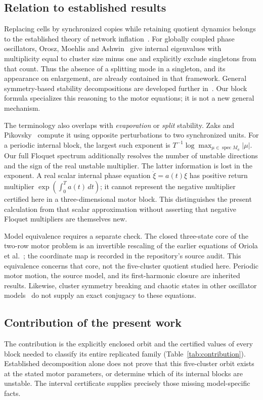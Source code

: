 \documentclass[11pt]{article}
\newcommand{\spec}{\operatorname{spec}}
\begin{document}
\subsection{Relation to established results}
Replacing cells by synchronized copies while retaining quotient dynamics
belongs to the established theory of network inflation~\cite{aguiar}.
For globally coupled phase oscillators, Orosz, Moehlis and
Ashwin~\cite[Sec.~2, Eqs.~(2.19)--(2.23)]{orosz} give internal eigenvalues
with multiplicity equal to cluster size minus one and explicitly exclude
singletons from that count. Thus the absence of a splitting mode in a
singleton, and its appearance on enlargement, are already contained in
that framework. General symmetry-based stability decompositions are
developed further in~\cite{pecora,sorrentino}. Our block formula specializes
this reasoning to the motor equations; it is not a new general mechanism.

The terminology also overlaps with \emph{evaporation} or \emph{split}
stability. Zaks and Pikovsky~\cite[Methods]{zaks} compute it using opposite
perturbations to two synchronized units. For a periodic internal block,
the largest such exponent is $T^{-1}\log\max_{\mu\in\spec M_a}|\mu|$.
Our full Floquet spectrum additionally resolves the number of unstable
directions and the sign of the real unstable multiplier.
The latter information is lost in the exponent. A real scalar internal
phase equation $\dot\xi=a(t)\xi$ has positive return multiplier
$\exp(\int_0^T a(t)\,dt)$; it cannot represent the negative multiplier
certified here in a three-dimensional motor block. This distinguishes
the present calculation from that scalar approximation without asserting
that negative Floquet multipliers are themselves new.

Model equivalence requires a separate check. The closed three-state core
of the two-row motor problem is an invertible rescaling of the earlier
equations of Oriola et al.~\cite[Eq.~(10)]{oriola}; the coordinate map is
recorded in the repository's source audit. This equivalence concerns that
core, not the five-cluster quotient studied here. Periodic motor motion,
the source model, and its first-harmonic closure are inherited results.
Likewise, cluster symmetry breaking and chaotic states in other oscillator
models~\cite{haugland} do not supply an exact conjugacy to these equations.

\subsection{Contribution of the present work}
The contribution is the explicitly enclosed orbit and the certified values
of every block needed to classify its entire replicated family
(Table~\ref{tab:contribution}). Established decomposition alone does not
prove that this five-cluster orbit exists at the stated motor parameters,
or determine which of its internal blocks are unstable. The interval
certificate supplies precisely those missing model-specific facts.
\end{document}
